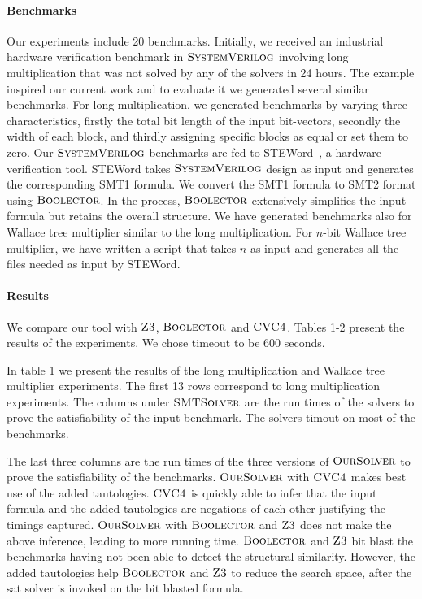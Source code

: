 \paragraph{\bf Benchmarks}
%
Our experiments include 20 benchmarks.
%
Initially, we received an industrial hardware verification benchmark in $\textsc{SystemVerilog}$ involving long multiplication that was not solved by any of the solvers in 24 hours.
%
The example inspired our current work and to evaluate it we generated several similar benchmarks.
%
For long multiplication, we generated benchmarks by varying three characteristics, firstly the total bit length of the input bit-vectors, secondly the width of each block, and thirdly assigning specific blocks as equal or set them to zero.
%
Our $\textsc{SystemVerilog}$ benchmarks are fed to STEWord~\cite{Word-level-Symbolic-Trajectory-Evaluation}, a hardware verification tool.
%
STEWord takes $\textsc{SystemVerilog}$ design as input and generates the corresponding SMT1 formula.
%
We convert the SMT1 formula to SMT2 format using $\textsc{Boolector}$.
%
In the process, $\textsc{Boolector}$ extensively simplifies the input formula but retains the overall structure.
%
We have generated benchmarks also for Wallace tree multiplier similar to the long multiplication.
%
For $n$-bit Wallace tree multiplier, we have written a script that takes $n$ as input and generates all the files needed as input by STEWord.
%

\paragraph{\bf Results}
%
We compare our tool with $\textsc{Z3}$, $\textsc{Boolector}$ and $\textsc{CVC4}$. Tables 1-2 present the results of the experiments. We chose timeout to be 600 seconds.
%


In table 1 we present the results of the long multiplication and Wallace tree multiplier experiments. The first 13 rows correspond to long multiplication experiments. The columns under $\textsc{SMTSolver}$ are the run times of the solvers to prove the satisfiability of the input benchmark. The solvers timout on most of the benchmarks. 

The last three columns are the run times of the three versions of $\textsc{OurSolver}$ to prove the satisfiability of the benchmarks.
%
$\textsc{OurSolver}$ with $\textsc{CVC4}$ makes best use of the added tautologies. $\textsc{CVC4}$ is quickly able to infer that the input formula and the added tautologies are negations of each other justifying the timings captured. 
$\textsc{OurSolver}$ with $\textsc{Boolector}$ and $\textsc{Z3}$ does not make the above inference, leading to more running time. $\textsc{Boolector}$ and $\textsc{Z3}$ bit blast the benchmarks having not been able to detect the structural similarity. However, the added tautologies help $\textsc{Boolector}$ and $\textsc{Z3}$ to reduce the search space, after the sat solver is invoked on the bit blasted formula.


